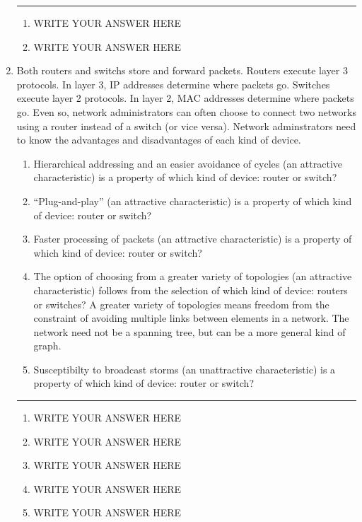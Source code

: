 \documentclass[twoside]{article}
\newenvironment{answer}
  {\vspace*{0.2cm} \rule{12cm}{0.04cm} \vspace*{0.2cm}}
  {\vspace*{0.2cm}}
\begin{document}
\begin{enumerate}
  \begin{answer}

  \begin{enumerate}
    \item WRITE YOUR ANSWER HERE
    \item WRITE YOUR ANSWER HERE
    \end{enumerate}

    \end{answer}

  \item Both routers and switchs store and forward packets.
    Routers execute layer 3 protocols. In layer 3, IP addresses determine
    where packets go.
    Switches execute layer 2 protocols. In layer 2, MAC addresses determine
    where packets go.
    Even so, network administrators can often choose to connect two networks
    using a router instead of a switch (or vice versa). 
    Network adminstrators need to know the advantages and disadvantages of
    each kind of device.

  \begin{enumerate}
    \item Hierarchical addressing and an easier avoidance of cycles (an attractive characteristic)
      is a property of which kind of device: router or switch?
    \item ``Plug-and-play'' (an attractive characteristic) is a property of which
      kind of device: router or switch?
    \item Faster processing of packets (an attractive characteristic) is a property
      of which kind of device: router or switch?
    \item The option of choosing from a greater variety of topologies (an attractive characteristic)
      follows from the selection of which kind of device: routers or switches?
      A greater variety of topologies means freedom from the constraint of avoiding multiple links
      between elements in a network. The network need not be a spanning tree, but can be a more
      general kind of graph.
    \item Susceptibilty to broadcast storms (an unattractive characteristic) is a property
      of which kind of device: router or switch?
    \end{enumerate}

  \begin{answer}

  \begin{enumerate}
    \item WRITE YOUR ANSWER HERE
    \item WRITE YOUR ANSWER HERE
    \item WRITE YOUR ANSWER HERE
    \item WRITE YOUR ANSWER HERE
    \item WRITE YOUR ANSWER HERE
    \end{enumerate}


\end{answer}
\end{enumerate}
\end{document}
